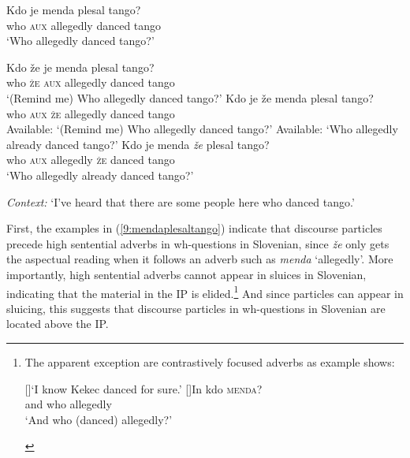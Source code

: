 \documentclass[output=paper,
modfonts,
newtxmath,
hidelinks
]{langscibook}
\begin{document}
\begin{exe}
\ex \gll Kdo je menda plesal tango?\\
         who \textsc{aux} allegedly danced tango\\
 \trans `Who allegedly danced tango?'
\ex \label{9:mendaplesaltango}
\begin{xlist}
 \ex \gll	Kdo že je menda plesal tango?\\
 who \textsc{že} \textsc{aux} allegedly danced tango\\
\trans `(Remind me) Who allegedly danced tango?'
\ex \gll	Kdo je že menda plesal tango?\\
 who \textsc{aux} \textsc{že}  allegedly danced tango\\
 \glt Available: `(Remind me) Who allegedly danced tango?'
 \glt Available: `Who allegedly already danced tango?'
\ex \gll	Kdo je menda \textit{že} plesal tango?\\
 who \textsc{aux} allegedly \textsc{že} danced tango\\
\trans `Who allegedly already danced tango?'
\end{xlist}
\ex \textit{Context:} `I've heard that there are some people here who danced tango.'
\begin{xlist}
\end{xlist}
\end{exe}

\noindent First, the examples in (\ref{9:mendaplesaltango}) indicate that discourse particles precede high sentential adverbs in wh-questions in Slovenian, since \textit{že} only gets the aspectual reading when it follows an adverb such as \textit{menda} `allegedly'. More importantly, high sentential adverbs cannot appear in sluices in Slovenian, indicating that the material in the IP is elided.\footnote{The apparent exception are contrastively focused adverbs as example  shows:

\ea \label{9:fn16exi}
\begin{xlist}
[]{`I know Kekec danced for sure.'}
[]{\gll In kdo \textsc{menda}?\\
and who allegedly\\
\glt `And who (danced) allegedly?'}
\end{xlist}
\zlast} And since particles can appear in sluicing, this suggests that discourse particles in wh-questions in Slovenian are located above the IP.
\end{document}
